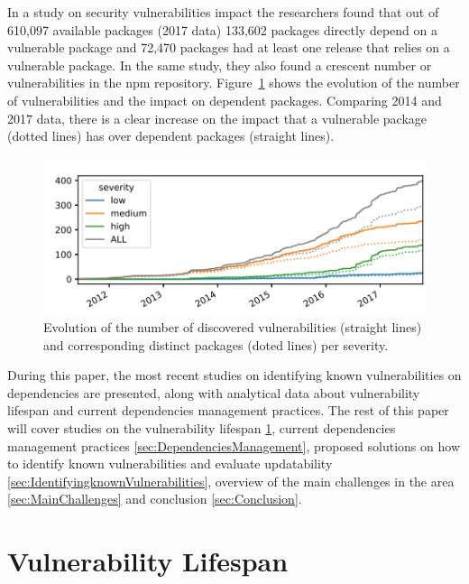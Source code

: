 \documentclass[pdf,bookmarks,colorlinks=true]{IEEEtran}
\begin{document}
In a study on security vulnerabilities impact \cite{Decan2018} the researchers found that out of 610,097 available packages (2017 data) 133,602 packages directly depend on a vulnerable package and 72,470 packages had at least one release that relies on a vulnerable package.
In the same study, they also found a crescent number or vulnerabilities in the npm repository. Figure~\ref{SVEvolution} shows the evolution of the number of vulnerabilities and the impact on dependent packages. Comparing 2014 and 2017 data, there is a clear increase on the impact that a vulnerable package (dotted lines) has over dependent packages (straight lines).

\begin{figure}[h]
	\centering
	\includegraphics[scale=0.70]{SVEvolution.png}
	\caption{Evolution of the number of discovered vulnerabilities (straight lines) and corresponding distinct packages (doted lines) per severity.}
	\label{SVEvolution}
\end{figure}


During this paper, the most recent studies on identifying known vulnerabilities on dependencies are presented, along with analytical data about vulnerability lifespan and current dependencies management practices.
The rest of this paper will cover studies on the vulnerability lifespan \ref{sec:VulnerabilityTimeFrame}, current dependencies management practices \ref{sec:DependenciesManagement}, proposed solutions on how to identify known vulnerabilities and evaluate updatability \ref{sec:IdentifyingknownVulnerabilities}, overview of the main challenges in the area \ref{sec:MainChallenges} and conclusion \ref{sec:Conclusion}.  

\section{Vulnerability Lifespan}
\label{sec:VulnerabilityTimeFrame}
\end{document}
